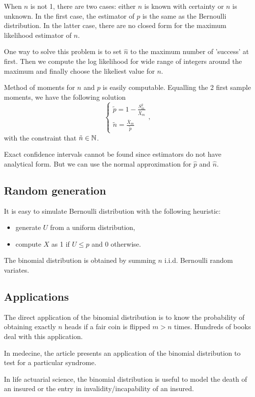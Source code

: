 When $n$ is not 1, there are two cases: either $n$ is known with certainty or $n$ is unknown.
In the first case, the estimator of $p$ is the same as the Bernoulli distribution. In the latter case, there are no closed form for the maximum likelihood estimator of $n$.

One way to solve this problem is to set $\hat n$ to the maximum number of 'success' at first. Then we compute the log likelihood for wide range of integers around the maximum and finally choose the likeliest value for $n$. 

Method of moments for $n$ and $p$ is easily computable. Equalling the 2 first sample moments, we
have the following solution
$$
\left\{
\begin{array}{l}
\tilde p = 1-\frac{S_m^2}{\bar X_m}\\
\tilde n = \frac{\bar X_m}{\tilde p} 
\end{array}
\right. ,
$$
with the constraint that $\tilde n\in \mathbb N$.

Exact confidence intervals cannot be found since estimators do not have analytical form. But we can use the normal approximation for $\hat p$ and $\hat n$.



\subsection{Random generation}
It is easy to simulate Bernoulli distribution with the following heuristic:
\begin{itemize}
\item generate $U$ from a uniform distribution,
\item compute $X$ as 1 if $U\leq p$ and 0 otherwise.
\end{itemize}
The binomial distribution is obtained by summing $n$ i.i.d. Bernoulli random variates.

\subsection{Applications}
The direct application of the binomial distribution is to know the probability of obtaining exactly $n$ heads if a fair coin is flipped $m>n$ times. Hundreds of books deal with this application.

In medecine, the article \cite{nejm} presents an application of the binomial distribution to test for a particular syndrome.

In life actuarial science, the binomial distribution is useful to model the death of an insured or the entry in invalidity/incapability of an insured.

